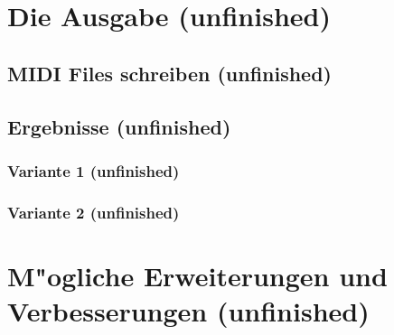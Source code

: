 {\section{Die Ausgabe (unfinished)}
\subsection{MIDI Files schreiben (unfinished)}
\subsection{Ergebnisse (unfinished)}
\subsubsection{Variante 1 (unfinished)}
\subsubsection{Variante 2 (unfinished)}

\section{M"ogliche Erweiterungen und Verbesserungen (unfinished)}

} %